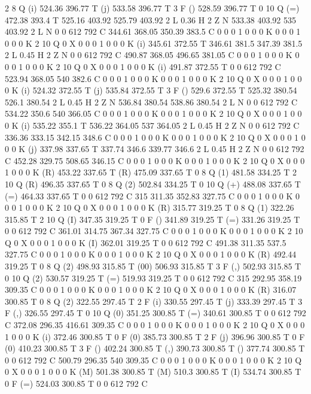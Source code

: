 2 8 Q
(i) 524.36 396.77 T
(j) 533.58 396.77 T
3 F
() 528.59 396.77 T
0 10 Q
(=) 472.38 393.4 T
525.16 403.92 525.79 403.92 2 L
0.36 H
2 Z
N
533.38 403.92 535 403.92 2 L
N
0 0 612 792 C
344.61 368.05 350.39 383.5 C
0 0 0 1 0 0 0 K
0 0 0 1 0 0 0 K
2 10 Q
0 X
0 0 0 1 0 0 0 K
(i) 345.61 372.55 T
346.61 381.5 347.39 381.5 2 L
0.45 H
2 Z
N
0 0 612 792 C
490.87 368.05 496.65 381.05 C
0 0 0 1 0 0 0 K
0 0 0 1 0 0 0 K
2 10 Q
0 X
0 0 0 1 0 0 0 K
(i) 491.87 372.55 T
0 0 612 792 C
523.94 368.05 540 382.6 C
0 0 0 1 0 0 0 K
0 0 0 1 0 0 0 K
2 10 Q
0 X
0 0 0 1 0 0 0 K
(i) 524.32 372.55 T
(j) 535.84 372.55 T
3 F
() 529.6 372.55 T
525.32 380.54 526.1 380.54 2 L
0.45 H
2 Z
N
536.84 380.54 538.86 380.54 2 L
N
0 0 612 792 C
534.22 350.6 540 366.05 C
0 0 0 1 0 0 0 K
0 0 0 1 0 0 0 K
2 10 Q
0 X
0 0 0 1 0 0 0 K
(i) 535.22 355.1 T
536.22 364.05 537 364.05 2 L
0.45 H
2 Z
N
0 0 612 792 C
336.36 333.15 342.15 348.6 C
0 0 0 1 0 0 0 K
0 0 0 1 0 0 0 K
2 10 Q
0 X
0 0 0 1 0 0 0 K
(j) 337.98 337.65 T
337.74 346.6 339.77 346.6 2 L
0.45 H
2 Z
N
0 0 612 792 C
452.28 329.75 508.65 346.15 C
0 0 0 1 0 0 0 K
0 0 0 1 0 0 0 K
2 10 Q
0 X
0 0 0 1 0 0 0 K
(R) 453.22 337.65 T
(R) 475.09 337.65 T
0 8 Q
(1) 481.58 334.25 T
2 10 Q
(R) 496.35 337.65 T
0 8 Q
(2) 502.84 334.25 T
0 10 Q
(+) 488.08 337.65 T
(=) 464.33 337.65 T
0 0 612 792 C
315 311.35 352.83 327.75 C
0 0 0 1 0 0 0 K
0 0 0 1 0 0 0 K
2 10 Q
0 X
0 0 0 1 0 0 0 K
(R) 315.77 319.25 T
0 8 Q
(1) 322.26 315.85 T
2 10 Q
(I) 347.35 319.25 T
0 F
() 341.89 319.25 T
(=) 331.26 319.25 T
0 0 612 792 C
361.01 314.75 367.34 327.75 C
0 0 0 1 0 0 0 K
0 0 0 1 0 0 0 K
2 10 Q
0 X
0 0 0 1 0 0 0 K
(I) 362.01 319.25 T
0 0 612 792 C
491.38 311.35 537.5 327.75 C
0 0 0 1 0 0 0 K
0 0 0 1 0 0 0 K
2 10 Q
0 X
0 0 0 1 0 0 0 K
(R) 492.44 319.25 T
0 8 Q
(2) 498.93 315.85 T
(00) 506.93 315.85 T
3 F
(,) 502.93 315.85 T
0 10 Q
(2) 530.57 319.25 T
(=) 519.93 319.25 T
0 0 612 792 C
315 292.95 358.19 309.35 C
0 0 0 1 0 0 0 K
0 0 0 1 0 0 0 K
2 10 Q
0 X
0 0 0 1 0 0 0 K
(R) 316.07 300.85 T
0 8 Q
(2) 322.55 297.45 T
2 F
(i) 330.55 297.45 T
(j) 333.39 297.45 T
3 F
(,) 326.55 297.45 T
0 10 Q
(0) 351.25 300.85 T
(=) 340.61 300.85 T
0 0 612 792 C
372.08 296.35 416.61 309.35 C
0 0 0 1 0 0 0 K
0 0 0 1 0 0 0 K
2 10 Q
0 X
0 0 0 1 0 0 0 K
(i) 372.46 300.85 T
0 F
(0) 385.73 300.85 T
2 F
(j) 396.96 300.85 T
0 F
(0) 410.23 300.85 T
3 F
() 402.24 300.85 T
(,) 390.73 300.85 T
() 377.74 300.85 T
0 0 612 792 C
500.79 296.35 540 309.35 C
0 0 0 1 0 0 0 K
0 0 0 1 0 0 0 K
2 10 Q
0 X
0 0 0 1 0 0 0 K
(M) 501.38 300.85 T
(M) 510.3 300.85 T
(I) 534.74 300.85 T
0 F
(=) 524.03 300.85 T
0 0 612 792 C
